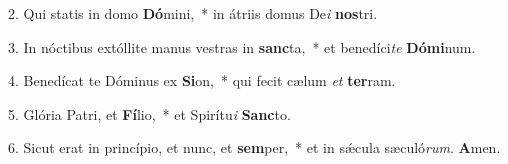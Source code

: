 2. Qui statis in domo \textbf{Dó}mini,~*  in átriis domus De\textit{i} \textbf{nos}tri.\

3. In nóctibus extóllite manus vestras in \textbf{sanc}ta,~*  et benedíci\textit{te} \textbf{Dó}\textbf{mi}num.\

4. Benedícat te Dóminus ex \textbf{Si}on,~*  qui fecit cælum \textit{et} \textbf{ter}ram.\

5. Glória Patri, et \textbf{Fí}lio,~*  et Spirítu\textit{i} \textbf{Sanc}to.\

6. Sicut erat in princípio, et nunc, et \textbf{sem}per,~*  et in sǽcula sæculó\textit{rum}. \textbf{A}men.\

